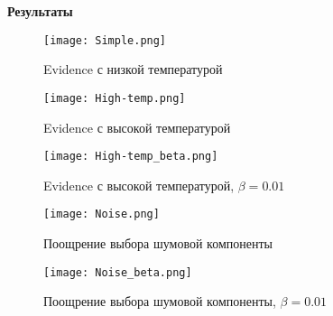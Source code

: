 \documentclass[12pt]{article}
\begin{document}
\textbf{Результаты}\\
\begin{figure}
\texttt{[image: Simple.png]}
\caption{Evidence с низкой температурой}
\end{figure}

\begin{figure}
\texttt{[image: High-temp.png]}
\caption{Evidence с высокой температурой}
\end{figure}


\begin{figure}
\texttt{[image: High-temp\_beta.png]}
\caption{Evidence с высокой температурой, $\beta = 0.01$}
\end{figure}


\begin{figure}
\texttt{[image: Noise.png]}
\caption{Поощрение выбора шумовой компоненты}
\end{figure}


\begin{figure}
\texttt{[image: Noise\_beta.png]}
\caption{Поощрение выбора шумовой компоненты, $\beta = 0.01$}
\end{figure}
\end{document}
